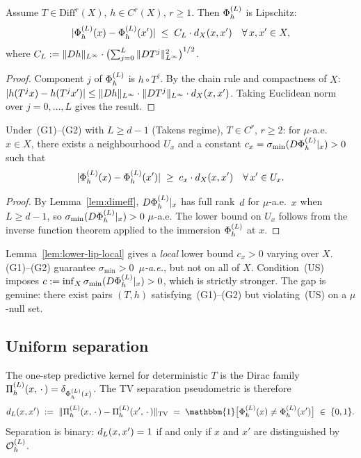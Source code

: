 \begin{lemma}
\label{lem:upper-lip}
Assume $T \in \mathrm{Diff}^r(X)$, $h \in C^r(X)$, $r \geq 1$.
Then $\Phi_h^{(L)}$ is Lipschitz:
\[
  |\Phi_h^{(L)}(x) - \Phi_h^{(L)}(x')| \;\leq\; C_L \cdot d_X(x,x')
  \quad\forall\, x, x' \in X,
\]
where $C_L := \|Dh\|_{L^{\infty}} \cdot \bigl(\sum_{j=0}^{L}
\|DT^j\|_{L^{\infty}}^2\bigr)^{1/2}$.
\end{lemma}

\begin{proof}
Component $j$ of $\Phi_h^{(L)}$ is $h \circ T^j$.
By the chain rule and compactness of $X$:
$|h(T^j x) - h(T^j x')| \leq \|Dh\|_{L^{\infty}} \cdot \|DT^j\|_{L^{\infty}} \cdot d_X(x,x')$.
Taking Euclidean norm over $j = 0, \ldots, L$ gives the result.
\end{proof}

\begin{lemma}
\label{lem:lower-lip-local}
Under~(G1)--(G2) with $L \geq d-1$ (Takens regime), $T \in C^r$, $r \geq 2$:
for $\mu$-a.e.\ $x \in X$, there exists a neighbourhood $U_x$ and a constant
$c_x = \sigma_{\min}(D\Phi_h^{(L)}|_x) > 0$ such that
\[
  |\Phi_h^{(L)}(x) - \Phi_h^{(L)}(x')| \;\geq\; c_x \cdot d_X(x,x')
  \quad\forall\, x' \in U_x.
\]
\end{lemma}

\begin{proof}
By Lemma~\ref{lem:dimeff}, $D\Phi_h^{(L)}|_x$ has full rank~$d$ for $\mu$-a.e.\ $x$
when $L \geq d-1$, so $\sigma_{\min}(D\Phi_h^{(L)}|_x) > 0~\mu$-a.e.
The lower bound on $U_x$ follows from the inverse function theorem applied to
the immersion $\Phi_h^{(L)}$ at $x$.
\end{proof}

\begin{remark}
Lemma~\ref{lem:lower-lip-local} gives a \emph{local} lower bound $c_x > 0$
varying over $X$.
(G1)--(G2) guarantee $\sigma_{\min} > 0$~\emph{$\mu$-a.e.}, but not on all of $X$.
Condition~(US) imposes $c := \inf_X \sigma_{\min}(D\Phi_h^{(L)}|_x) > 0$, which is
strictly stronger.
The gap is genuine: there exist pairs $(T,h)$ satisfying~(G1)--(G2) but
violating~(US) on a $\mu$-null set.
\end{remark}

\subsection{Uniform separation}

The one-step predictive kernel for deterministic $T$ is the Dirac family
$\Pi_h^{(L)}(x,\,\cdot\,) = \delta_{\Phi_h^{(L)}(x)}$.
The TV separation pseudometric is therefore
\[
  \preddisc{L}(x,x')
  \;:=\;
  \|\PihL(x,\,\cdot\,) - \PihL(x',\,\cdot\,)\|_{\mathrm{TV}}
  \;=\;
  \mathbbm{1}\bigl[\PhiL(x) \neq \PhiL(x')\bigr]
  \;\in\; \{0,1\}.
\]
Separation is binary: $d_{L}(x,x') = 1$ if and only if
$x$ and $x'$ are distinguished by $\mathcal{O}_h^{(L)}$.

